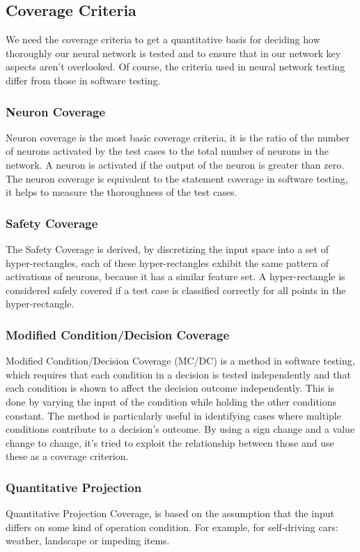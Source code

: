 \subsection{Coverage Criteria}\label{subsec:coverage-criteria}
We need the coverage criteria to get a quantitative basis for deciding how thoroughly our neural network is tested and to ensure that in our network key aspects aren't overlooked.
Of course, the criteria used in neural network testing differ from those in software testing.

\subsubsection{Neuron Coverage}
Neuron coverage is the most basic coverage criteria, it is the ratio of the number of neurons activated by the test cases to the total number of neurons in the network.
A neuron is activated if the output of the neuron is greater than zero.
The neuron coverage is equivalent to the statement coverage in software testing, it helps to measure the thoroughness of the test cases.

\subsubsection{Safety Coverage}
The Safety Coverage is derived, by discretizing the input space into a set of hyper-rectangles, each of these hyper-rectangles exhibit the same pattern of activations of neurons, because it has a similar feature set.
A hyper-rectangle is considered safely covered if a test case is classified correctly for all points in the hyper-rectangle.
\subsubsection{Modified Condition/Decision Coverage}
Modified Condition/Decision Coverage (MC/DC) is a method in software testing, which requires that each condition in a decision is tested independently and that each condition is shown to affect the decision outcome independently.
This is done by varying the input of the condition while holding the other conditions constant.
The method is particularly useful in identifying cases where multiple conditions contribute to a decision's outcome.
By using a sign change and a value change to change, it's tried to exploit the relationship between those and use these as a coverage criterion.
\subsubsection{Quantitative Projection}
Quantitative Projection Coverage, is based on the assumption that the input differs on some kind of operation condition.
For example, for self-driving cars: weather, landscape or impeding items.

